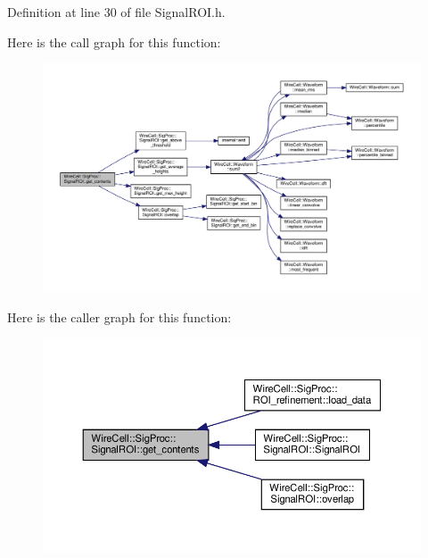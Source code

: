 Definition at line 30 of file Signal\+R\+O\+I.\+h.

Here is the call graph for this function\+:
\nopagebreak
\begin{figure}[H]
\begin{center}
\leavevmode
\includegraphics[width=350pt]{class_wire_cell_1_1_sig_proc_1_1_signal_r_o_i_aa2fee1613b1c49322cf5d738261cf1c9_cgraph}
\end{center}
\end{figure}
Here is the caller graph for this function\+:
\nopagebreak
\begin{figure}[H]
\begin{center}
\leavevmode
\includegraphics[width=350pt]{class_wire_cell_1_1_sig_proc_1_1_signal_r_o_i_aa2fee1613b1c49322cf5d738261cf1c9_icgraph}
\end{center}
\end{figure}
\mbox{\label{class_wire_cell_1_1_sig_proc_1_1_signal_r_o_i_a826112ffb7fed5ffeff403e4a34c036c}} 
